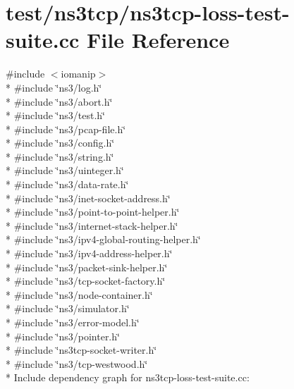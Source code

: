 \hypertarget{ns3tcp-loss-test-suite_8cc}{}\section{test/ns3tcp/ns3tcp-\/loss-\/test-\/suite.cc File Reference}
\label{ns3tcp-loss-test-suite_8cc}
{\ttfamily \#include $<$iomanip$>$}\\*
{\ttfamily \#include \char`\"{}ns3/log.\+h\char`\"{}}\\*
{\ttfamily \#include \char`\"{}ns3/abort.\+h\char`\"{}}\\*
{\ttfamily \#include \char`\"{}ns3/test.\+h\char`\"{}}\\*
{\ttfamily \#include \char`\"{}ns3/pcap-\/file.\+h\char`\"{}}\\*
{\ttfamily \#include \char`\"{}ns3/config.\+h\char`\"{}}\\*
{\ttfamily \#include \char`\"{}ns3/string.\+h\char`\"{}}\\*
{\ttfamily \#include \char`\"{}ns3/uinteger.\+h\char`\"{}}\\*
{\ttfamily \#include \char`\"{}ns3/data-\/rate.\+h\char`\"{}}\\*
{\ttfamily \#include \char`\"{}ns3/inet-\/socket-\/address.\+h\char`\"{}}\\*
{\ttfamily \#include \char`\"{}ns3/point-\/to-\/point-\/helper.\+h\char`\"{}}\\*
{\ttfamily \#include \char`\"{}ns3/internet-\/stack-\/helper.\+h\char`\"{}}\\*
{\ttfamily \#include \char`\"{}ns3/ipv4-\/global-\/routing-\/helper.\+h\char`\"{}}\\*
{\ttfamily \#include \char`\"{}ns3/ipv4-\/address-\/helper.\+h\char`\"{}}\\*
{\ttfamily \#include \char`\"{}ns3/packet-\/sink-\/helper.\+h\char`\"{}}\\*
{\ttfamily \#include \char`\"{}ns3/tcp-\/socket-\/factory.\+h\char`\"{}}\\*
{\ttfamily \#include \char`\"{}ns3/node-\/container.\+h\char`\"{}}\\*
{\ttfamily \#include \char`\"{}ns3/simulator.\+h\char`\"{}}\\*
{\ttfamily \#include \char`\"{}ns3/error-\/model.\+h\char`\"{}}\\*
{\ttfamily \#include \char`\"{}ns3/pointer.\+h\char`\"{}}\\*
{\ttfamily \#include \char`\"{}ns3tcp-\/socket-\/writer.\+h\char`\"{}}\\*
{\ttfamily \#include \char`\"{}ns3/tcp-\/westwood.\+h\char`\"{}}\\*
Include dependency graph for ns3tcp-\/loss-\/test-\/suite.cc\+:
